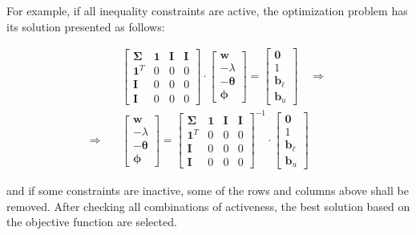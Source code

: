 \documentclass{beamer}
\begin{document}
\begin{frame}

\justifying
For example, if all inequality constraints are active, the optimization problem has its solution presented as follows:

\justifying
\begin{equation*}
\begin{aligned}
	& \begin{bmatrix}
		\mathbf{\Sigma} & \mathbf{1} & \mathbf{I} & \mathbf{I} \\
		\mathbf{1}^{T} & 0 & 0 & 0 \\
		\mathbf{I} & 0 & 0 & 0 \\
		\mathbf{I} & 0 & 0 & 0
	   \end{bmatrix}
	   \cdot
	   \begin{bmatrix}
	   	\mathbf{w} \\
		-\lambda \\
		-\boldsymbol\theta \\
		\boldsymbol\phi
	  \end{bmatrix}
	  =
	  \begin{bmatrix}
	  	\mathbf{0} \\ 
		1 \\
		\mathbf{b}_{\ell} \\
		\mathbf{b}_{u}
	\end{bmatrix}
	\quad \Rightarrow \\
	\Rightarrow \quad &
	\begin{bmatrix}
	   	\mathbf{w} \\
		-\lambda \\
		-\boldsymbol\theta \\
		\boldsymbol\phi
	  \end{bmatrix}
	  =
	  \begin{bmatrix}
		\mathbf{\Sigma} & \mathbf{1} & \mathbf{I} & \mathbf{I} \\
		\mathbf{1}^{T} & 0 & 0 & 0 \\
		\mathbf{I} & 0 & 0 & 0 \\
		\mathbf{I} & 0 & 0 & 0
	   \end{bmatrix}^{-1}
	   \cdot
	  \begin{bmatrix}
	  	\mathbf{0} \\ 
		1 \\
		\mathbf{b}_{\ell} \\
		\mathbf{b}_{u}
	\end{bmatrix}
\end{aligned}
\end{equation*}

\justifying
and if some constraints are inactive, some of the rows and columns above shall be removed. After checking all combinations of activeness, the best solution based on the objective function are selected.

\end{frame}
\end{document}
